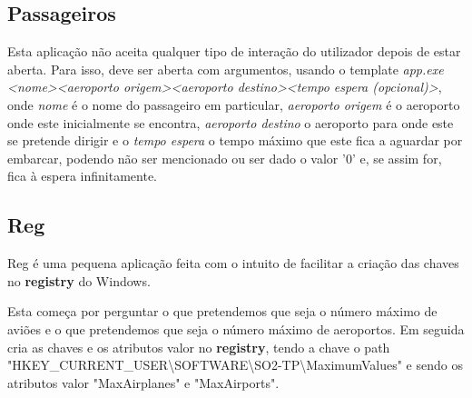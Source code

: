 \documentclass[11pt]{article}
\begin{document}
	
	\large
	\subsection{Passageiros}
	\normalsize
	
	Esta aplicação não aceita qualquer tipo de interação do utilizador depois de estar aberta. Para isso, deve ser aberta com argumentos, usando o template \textit{app.exe \textless{nome}\textgreater \textless{aeroporto origem}\textgreater \textless{aeroporto destino}\textgreater \textless{tempo espera (opcional)}\textgreater}, onde \textit{nome} é o nome do passageiro em particular, \textit{aeroporto origem} é o aeroporto onde este inicialmente se encontra, \textit{aeroporto destino} o aeroporto para onde este se pretende dirigir e o \textit{tempo espera} o tempo máximo que este fica a aguardar por embarcar, podendo não ser mencionado ou ser dado o valor '0' e, se assim for, fica à espera infinitamente.
	
	
	\large
	\subsection{Reg}
	\normalsize

    Reg é uma pequena aplicação feita com o intuito de facilitar a criação das chaves no \textbf{registry} do Windows.
    
    Esta começa por perguntar o que pretendemos que seja o número máximo de aviões e o que pretendemos que seja o número máximo de aeroportos. Em seguida cria as chaves e os atributos valor no \textbf{registry}, tendo a chave o path "HKEY\_CURRENT\_USER\textbackslash{SOFTWARE}\textbackslash{SO2-TP}\textbackslash{MaximumValues}" e sendo os atributos valor "MaxAirplanes" e "MaxAirports".
	
	
	\large
\end{document}
